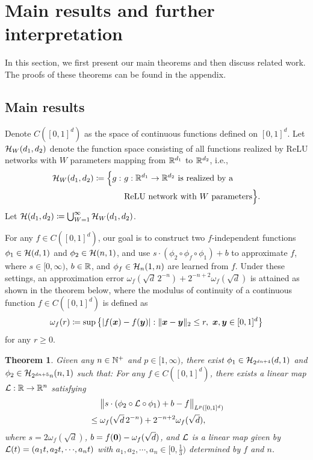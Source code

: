 \documentclass[nohyperref]{article}
\theoremstyle{plain}
\newtheorem{theorem}{Theorem}[section]
\theoremstyle{definition}
\theoremstyle{remark}
\begin{document}
\section{Main results and further interpretation}\label{sec:main}

In this section, we first present our main theorems and then discuss related work. The proofs of these theorems can be found in the appendix.

\subsection{Main results}
Denote $C([0,1]^d)$ as  the space of continuous functions defined on $[0,1]^d$. 
Let ${\mathcal{H}}_W(d_1,d_2)$ denote the function space consisting of all functions realized by ReLU networks with $W$ parameters mapping from $\R^{d_1}$ to $\R^{d_2}$, i.e.,
\begin{equation*}
\begin{split}
		\calH_W(d_1,d_2)\coloneqq \Big\{g:\ &\tn{$g:\R^{d_1}\to\R^{d_2}$ is realized by a }\\
			& \tn{ReLU network with $W$ parameters}\Big\}.
\end{split}
\end{equation*}
Let ${\mathcal{H}}(d_1,d_2)\coloneqq \bigcup_{W=1}^{\infty} {\mathcal{H}}_W(d_1,d_2)$.


For any $f\in C([0,1]^d)$, our goal is to construct two $f$-independent functions $\phi_1\in{\mathcal{H}}(d,1)$ and $\phi_2\in{\mathcal{H}}(n,1)$, and use $s\cdot(\phi_2\circ\phi_f \circ \phi_1)+b$ to approximate $f$, where $s\in [0,\infty)$, $b\in\R$, and $\phi_f\in {\mathcal{H}}_n(1,n)$ are learned from $f$.
Under these settings, an approximation error $\omega_f(\sqrt{d}\, 2^{-n})+2^{-n+2}\omega_f(\sqrt{d})$ is attained as shown in the theorem below,
where the modulus of continuity of a continuous function $f\in C([0,1]^d)$ is defined as 
\begin{equation*}
	\omega_f(r)\coloneqq \sup\big\{|f({\bm{x}})-f({\bm{y}})|: \|{\bm{x}}-{\bm{y}}\|_2\le r,\ {\bm{x}},{\bm{y}}\in [0,1]^d\big\}
\end{equation*}
for any $r\ge0$.
\begin{theorem}%
	\label{thm:main}
	Given any $n\in\N^+$ and $p\in [1,\infty)$, there exist $\phi_1\in {\mathcal{H}}_{2^{dn+4}}(d,1)$ and $\phi_2\in {\mathcal{H}}_{2^{dn+5}n}(n,1)$ such that: For any $f\in C([0,1]^d)$, there exists a linear map $\calL:\R\to \R^n$ satisfying
	\begin{equation*}
	\begin{split}
		&\quad\ \big\|s\cdot(\phi_2\circ {\mathcal{L}} \circ\phi_1)+b -f\big\|_{L^p([0,1]^d)}\\
		&\le \omega_f(\sqrt{d}\, 2^{-n})+2^{-n+2}\omega_f(\sqrt{d}),
	\end{split}
	\end{equation*}
	where $s=2\omega_f(\sqrt{d})$, $b=f({\bm{0}})-\omega_f(\sqrt{d})$, and ${\mathcal{L}}$ is a linear map given by $\calL(t)=(a_1t, a_2 t,\cdots,a_n t)$ with $a_1,a_2,\cdots,a_n\in [0,\tfrac{1}{3})$ determined by $f$ and $n$.
\end{theorem}
\end{document}
